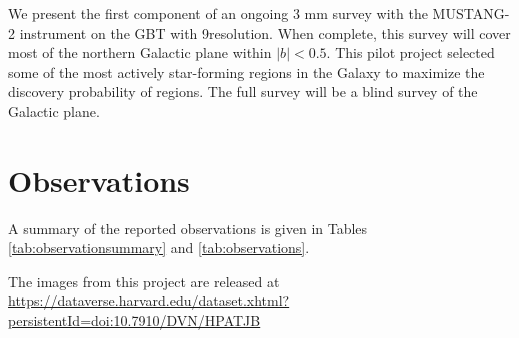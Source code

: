 \documentclass[twocolumn]{aastex62}
\newcommand{\MUSTANG}{MUSTANG-2\xspace}
\begin{document}

We present the first component of an ongoing 3 mm survey with the \MUSTANG
instrument on the GBT with 9\arcsec resolution.   When complete, this survey
will cover most of the northern Galactic plane within $|b|<0.5$.  
This pilot project selected some of the most actively star-forming regions in
the Galaxy to maximize the discovery probability of \hchii regions.  The full
survey will be a blind survey of the Galactic plane.


\section{Observations}

A summary of the reported observations is given in Tables
\ref{tab:observationsummary} and \ref{tab:observations}.

The images from this project are released at
\url{https://dataverse.harvard.edu/dataset.xhtml?persistentId=doi:10.7910/DVN/HPATJB}
\end{document}
